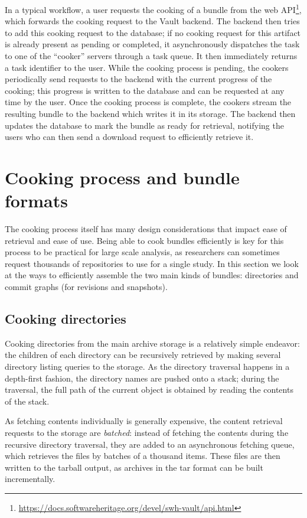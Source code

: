 In a typical workflow, a user requests the cooking of a bundle from the web
API\footnote{\url{https://docs.softwareheritage.org/devel/swh-vault/api.html}},
which forwards the cooking request to the Vault backend. The backend then tries
to add this cooking request to the database; if no cooking request for this
artifact is already present as pending or completed, it asynchronously
dispatches the task to one of the ``cooker'' servers through a task queue. It
then immediately returns a task identifier to the user. While the cooking
process is pending, the cookers periodically send requests to the backend with
the current progress of the cooking; this progress is written to the database
and can be requested at any time by the user. Once the cooking process is
complete, the cookers stream the resulting bundle to the backend which writes
it in its storage. The backend then updates the database to mark the bundle as
ready for retrieval, notifying the users who can then send a download request
to efficiently retrieve it.

\section{Cooking process and bundle formats}

The cooking process itself has many design considerations that impact ease of
retrieval and ease of use. Being able to cook bundles efficiently is key for
this process to be practical for large scale analysis, as researchers can
sometimes request thousands of repositories to use for a single study. In this
section we look at the ways to efficiently assemble the two main kinds of
bundles: directories and commit graphs (for revisions and snapshots).

\subsection{Cooking directories}

Cooking directories from the main archive storage is a relatively simple
endeavor: the children of each directory can be recursively retrieved by
making several directory listing queries to the storage. As the directory
traversal happens in a depth-first fashion, the directory names are pushed onto
a stack; during the traversal, the full path of the current object is obtained
by reading the contents of the stack.

As fetching contents individually is generally expensive, the content retrieval
requests to the storage are \emph{batched}: instead of fetching the contents
during the recursive directory traversal, they are added to an asynchronous
fetching queue, which retrieves the files by batches of a thousand items. These
files are then written to the tarball output, as archives in the tar format can
be built incrementally.

